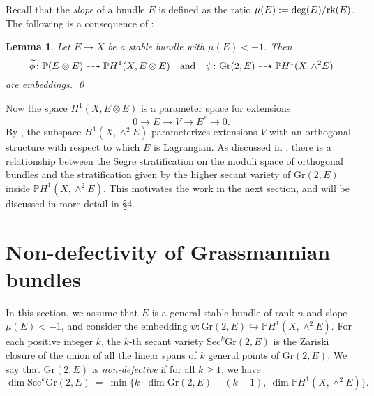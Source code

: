 \documentclass[10pt]{amsart}
\numberwithin{equation}{section}
\newcommand{\pp}{\mathbb P}
\newcommand{\Sec}{\mathrm{Sec}}
\newcommand{\Gr}{\mathrm{Gr}}
\newtheorem{lemma}[theorem]{{\textbf Lemma}}
\begin{document}
Recall that the \textsl{slope} of a bundle $E$ is defined as the ratio $\mu(E) := \deg (E) / {\rm rk} (E)$. The following is a consequence of \cite[Lemma 2.2]{CH3}:
\begin{lemma} \label{embed} Let $E \to X$ be a stable bundle with $\mu(E) < -1$. Then
\[ \widetilde{\phi} \colon \pp (E \otimes E) \dashrightarrow \pp H^{1}(X, E \otimes E) \quad \hbox{and} \quad \psi \colon \Gr(2, E) \dashrightarrow \pp H^{1}(X, \wedge^2 E) \]
are embeddings. \qed \end{lemma}

\noindent Now the space $H^1(X, E \otimes E) $ is a parameter space for extensions 
\[
0 \to E \to V \to E^* \to 0.
\]
By \cite[Criterion 2.1]{Hit1}, the subspace $H^{1}(X, \wedge^2 E)$ parameterizes extensions $V$ with an orthogonal structure with respect to which $E$ is Lagrangian. As discussed in \cite{CH3}, there is a relationship between the Segre stratification on the moduli space of orthogonal bundles and the stratification given by the higher secant variety of $\Gr(2, E)$ inside $\pp H^{1}(X, \wedge^2 E)$. This motivates the work in the next section, and will be discussed in more detail in \S 4.

\section{Non-defectivity of Grassmannian bundles}

In this section, we assume that $E$ is a general stable bundle of rank $n$ and slope $\mu(E) < -1$, and consider the embedding $\psi \colon \Gr(2, E) \hookrightarrow \pp H^1 (X, \wedge^2 E)$.
For each positive integer $k$, the $k$-th secant variety $\Sec^k \Gr(2, E)$ is the Zariski closure of the union of all the linear spans of $k$ general points of $\Gr(2,E)$. 
We say that $\Gr(2, E)$ is \textit{non-defective} if for all $k \ge 1$, we have
\[
\dim \Sec^k \Gr(2, E) \ = \ \min \{ k \cdot \dim \Gr(2, E) + (k-1), \ \dim \pp H^{1}(X, \wedge^2 E) \}.
\]
\end{document}
